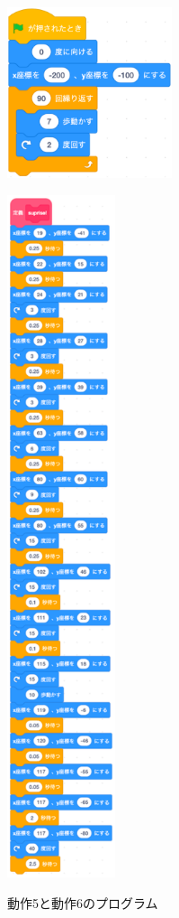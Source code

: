 \documentclass[11pt]{jreport}
\begin{document}
\begin{figure}
    \centering
    \begin{minipage}{0.45\linewidth}
        \centering
        \includegraphics[height=5cm]{5-program.eps}
        \label{5-program}
    \end{minipage}
    \hspace{0.04\columnwidth}
    \begin{minipage}{0.45\linewidth}
        \centering
        \includegraphics[height=20cm]{6-program.eps}
        \label{6-program}
    \end{minipage}
    \hspace{0.04\columnwidth}
    \caption{動作5と動作6のプログラム}
    \label{5-6}
\end{figure}
\end{document}

